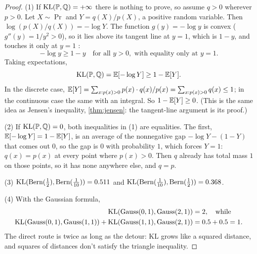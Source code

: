 \begin{proof}
(1) If $\mathrm{KL}(\mathbb{P}, \mathbb{Q}) = +\infty$ there is nothing to prove, so assume $q > 0$ wherever $p > 0$.
Let $X \sim \Pr$ and $Y = q(X)/p(X)$, a positive random variable.
Then $\log(p(X)/q(X)) = -\log Y$.
The function $g(y) = -\log y$ is convex ($g''(y) = 1/y^2 > 0$), so it lies above its tangent line at $y = 1$, which is $1 - y$, and touches it only at $y = 1$ :
\[
-\log y \geq 1 - y \quad \text{for all } y > 0, \text{ with equality only at } y = 1.
\]
Taking expectations,
\[
\mathrm{KL}(\mathbb{P}, \mathbb{Q}) = \operatorname*{\mathbb{E}}[-\log Y] \geq 1 - \operatorname*{\mathbb{E}}[Y].
\]
In the discrete case, $\operatorname*{\mathbb{E}}[Y] = \sum_{x: p(x) > 0} p(x) \cdot q(x)/p(x) = \sum_{x: p(x) > 0} q(x) \leq 1$; in the continuous case the same with an integral.
So $1 - \operatorname*{\mathbb{E}}[Y] \geq 0$. (This is the same idea as Jensen's inequality, \cref{thm:jensen}: the tangent-line argument is its proof.)

(2) If $\mathrm{KL}(\mathbb{P}, \mathbb{Q}) = 0$, both inequalities in (1) are equalities.
The first, $\operatorname*{\mathbb{E}}[-\log Y] = 1 - \operatorname*{\mathbb{E}}[Y]$, is an average of the nonnegative gap $-\log Y - (1 - Y)$ that comes out $0$, so the gap is $0$ with probability $1$, which forces $Y = 1$: $q(x) = p(x)$ at every point where $p(x) > 0$.
Then $q$ already has total mass $1$ on those points, so it has none anywhere else, and $q = p$.

(3) $\mathrm{KL}(\text{Bern}(\frac12), \text{Bern}(\frac1{10})) = 0.511$ and $\mathrm{KL}(\text{Bern}(\frac1{10}), \text{Bern}(\frac12)) = 0.368$.

(4) With the Gaussian formula,
\[
\begin{aligned}
\mathrm{KL}(\text{Gauss}(0,1), \text{Gauss}(2,1)) &= 2, \quad \text{while}\\
\mathrm{KL}(\text{Gauss}(0,1), \text{Gauss}(1,1)) + \mathrm{KL}(\text{Gauss}(1,1), \text{Gauss}(2,1)) &= 0.5 + 0.5 = 1.
\end{aligned}
\]
The direct route is twice as long as the detour: KL grows like a squared distance, and squares of distances don't satisfy the triangle inequality.
\end{proof}

